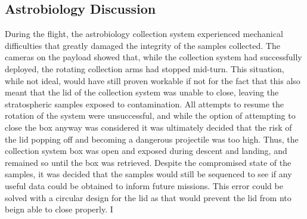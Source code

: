 \subsection{Astrobiology Discussion}
\label{sec:Astrobiology-Discussion}

During the flight, the astrobiology collection system experienced mechanical difficulties that greatly damaged the integrity of the samples collected. The cameras on the payload showed that, while the collection system had successfully deployed, the rotating collection arms had stopped mid-turn. This situation, while not ideal, would have still proven workable if not for the fact that this also meant that the lid of the collection system was unable to close, leaving the stratospheric samples exposed to contamination. All attempts to resume the rotation of the system were unsuccessful, and while the option of attempting to close the box anyway was considered it was ultimately decided that the risk of the lid popping off and becoming a dangerous projectile was too high. Thus, the collection system box was open and exposed during descent and landing, and remained so until the box was retrieved. Despite the compromised state of the samples, it was decided that the samples would still be sequenced to see if any useful data could be obtained to inform future missions. This error could be solved with a circular design for the lid as that would prevent the lid from nto beign able to close properly. I				


